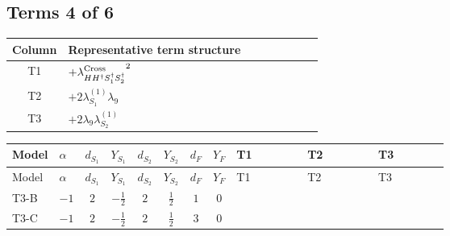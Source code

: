 \documentclass[8pt]{article}
\begin{document}
\begin{landscape}
\subsection*{Terms 4 of 6}
\begin{center}
\begin{tabular}{@{}c >{\raggedright\arraybackslash}p{0.82\linewidth}@{}}
\toprule
Column & Representative term structure \\
\midrule
T1 & \(\displaystyle +{\lambda_{H H^\dagger S_1^\dagger S_2^\dagger}^{\rm Cross}}^2\) \\
\midrule
T2 & \(\displaystyle +2 {\lambda_{S_1}^{(1)}} {\lambda_9}\) \\
\midrule
T3 & \(\displaystyle +2 {\lambda_9} {\lambda_{S_2}^{(1)}}\) \\
\midrule
\bottomrule
\end{tabular}
\end{center}
\smallskip
\tiny
\begin{longtable}{@{}llcccccc >{\raggedright\arraybackslash}p{0.21\linewidth} >{\raggedright\arraybackslash}p{0.21\linewidth} >{\raggedright\arraybackslash}p{0.21\linewidth}@{}}
\toprule
Model & $\alpha$ & $d_{S_1}$ & $Y_{S_1}$ & $d_{S_2}$ & $Y_{S_2}$ & $d_F$ & $Y_F$ & T1 & T2 & T3 \\
\midrule
\endfirsthead
\toprule
Model & $\alpha$ & $d_{S_1}$ & $Y_{S_1}$ & $d_{S_2}$ & $Y_{S_2}$ & $d_F$ & $Y_F$ & T1 & T2 & T3 \\
\midrule
\endhead
T3-B & $-1$ & $2$ & $-\frac{1}{2}$ & $2$ & $\frac{1}{2}$ & $1$ & $0$ & \scriptsize\adjustbox{max width=\linewidth}{$\begin{gathered} +{\lambda_{H H^\dagger S_1^\dagger S_2^\dagger}^{\rm Cross}}^2\end{gathered}$} & \scriptsize\adjustbox{max width=\linewidth}{$\begin{gathered} +2 {\lambda_{S_1}^{(1)}} {\lambda_9}\end{gathered}$} & \scriptsize\adjustbox{max width=\linewidth}{$\begin{gathered} +2 {\lambda_9} {\lambda_{S_2}^{(1)}}\end{gathered}$} \\
\midrule
T3-C & $-1$ & $2$ & $-\frac{1}{2}$ & $2$ & $\frac{1}{2}$ & $3$ & $0$ & \scriptsize\adjustbox{max width=\linewidth}{$\begin{gathered} +{\lambda_{H H^\dagger S_1^\dagger S_2^\dagger}^{\rm Cross}}^2\end{gathered}$} & \scriptsize\adjustbox{max width=\linewidth}{$\begin{gathered} +2 {\lambda_{S_1}^{(1)}} {\lambda_9}\end{gathered}$} & \scriptsize\adjustbox{max width=\linewidth}{$\begin{gathered} +2 {\lambda_9} {\lambda_{S_2}^{(1)}}\end{gathered}$} \\

\end{longtable}
\end{landscape}
\end{document}

